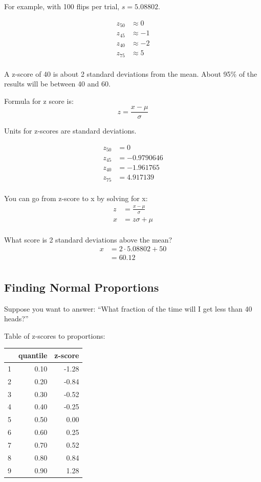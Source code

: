 \documentclass{exam}
\begin{document}
  For example, with 100 flips per trial, $s = 5.08802$.

  \begin{align*}
    z_{50} & \approx 0 \\
    z_{45} & \approx -1 \\
    z_{40} & \approx -2 \\
    z_{75} & \approx 5 \\
  \end{align*}

  A z-score of 40 is about 2 standard deviations from the mean.  About 95\% of the
  results will be between 40 and 60.

  Formula for z score is:
  \[
    z = \frac{x - \mu}{\sigma}
  \]

  Units for z-scores are standard deviations.

  \begin{align*}
    z_{50} &= 0 \\
    z_{45} &= -0.9790646 \\
    z_{40} &= -1.961765 \\
    z_{75} &= 4.917139 \\
  \end{align*}

  You can go from z-score to x by solving for x:
  \begin{align*}
    z &= \frac{x - \mu}{\sigma} \\
    x &= z \sigma + \mu \\
  \end{align*}

  What score is 2 standard deviations above the mean?
  \begin{align*}
    x & = 2 \cdot 5.08802 + 50 \\
      & = 60.12 \\
  \end{align*}

  \subsection{Finding Normal Proportions}
  Suppose you want to answer: ``What fraction of the time will I get less than 40
  heads?''

  Table of z-scores to proportions:
  \begin{table}[ht]
    \centering
    \begin{tabular}{rrr}
      \toprule
        & quantile & z-score \\
      \midrule
      1 & 0.10     & -1.28 \\
      2 & 0.20     & -0.84 \\
      3 & 0.30     & -0.52 \\
      4 & 0.40     & -0.25 \\
      5 & 0.50     & 0.00 \\
      6 & 0.60     & 0.25 \\
      7 & 0.70     & 0.52 \\
      8 & 0.80     & 0.84 \\
      9 & 0.90     & 1.28 \\
      \bottomrule
    \end{tabular}
  \end{table}
\end{document}

